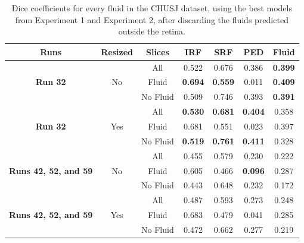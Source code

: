 \begin{table}[!ht]
	\caption{Dice coefficients for every fluid in the CHUSJ dataset, using the best models from Experiment 1 and Experiment 2, after discarding the fluids predicted outside the retina.}
	\centering
	\begin{tabular}{|c|c|c|c|c|c|c|}
		\hline
		\textbf{Runs} &
		\textbf{Resized} &
		\textbf{Slices} &  
		\textbf{IRF} & 
		\textbf{SRF} & 
		\textbf{PED} & 
		\textbf{Fluid} \\
		
		\hline
		
		\multirow{3}{*}{\textbf{Run 32}} & \multirow{3}{*}{No} & All & 0.522 & 0.676 & 0.386 & \textbf{0.399} \\
		
		& & Fluid & \textbf{0.694} & \textbf{0.559} & 0.011 & \textbf{0.409} \\	
		
		& & No Fluid & 0.509 & 0.746 & 0.393 & \textbf{0.391}\\
		
		\hline
		
		\multirow{3}{*}{\textbf{Run 32}} & \multirow{3}{*}{Yes} & 
		All & \textbf{0.530} & \textbf{0.681} & \textbf{0.404} & 0.358 \\
		
		& & Fluid & 0.681 & 0.551 & 0.023 & 0.397 \\
		
		& & No Fluid & \textbf{0.519} & \textbf{0.761} & \textbf{0.411} & 0.328\\
		
		\hline
		\hline
		
		\multirow{3}{*}{\parbox{2cm}{\textbf{Runs 42, 52, and 59}}} & \multirow{3}{*}{No} & All & 0.455 & 0.579 & 0.230 & 0.222 \\
		
		& & Fluid & 0.605 & 0.466 & \textbf{0.096} & 0.287 \\
		
		& & No Fluid & 0.443 & 0.648 & 0.232 & 0.172\\
		
		\hline
		
		\multirow{3}{*}{\parbox{2cm}{\textbf{Runs 42, 52, and 59}}} & \multirow{3}{*}{Yes} & All & 0.487 & 0.593 & 0.273 & 0.248 \\
		
		& & Fluid & 0.683 & 0.479 & 0.041 & 0.285 \\
		
		& & No Fluid & 0.472 & 0.662 & 0.277 & 0.219\\
		
		\hline
		
	\end{tabular}
	\label{tab:CHUSJProcessedSegmentationResults}
\end{table}

